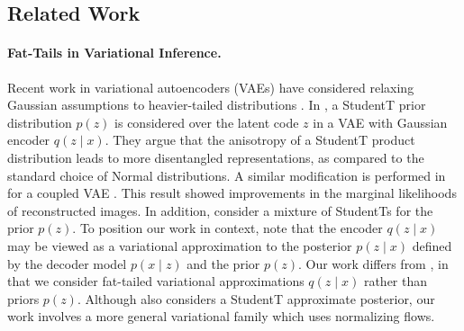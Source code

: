 \documentclass[nohyperref]{article}
\theoremstyle{plain}
\theoremstyle{definition}
\theoremstyle{remark}
\begin{document}
\subsection*{Related Work}
\vspace{-1mm}
\paragraph{Fat-Tails in Variational Inference.}

Recent work in variational autoencoders (VAEs) have considered relaxing Gaussian assumptions to heavier-tailed distributions \citep{mathieu2019disentangling,chen2019residual,boenninghoff2020variational,abiri2020variational}.
In \citet{mathieu2019disentangling}, a StudentT prior distribution $p(z)$ is considered over the latent code
$z$ in a VAE with Gaussian encoder $q(z \mid x)$. They argue
that the anisotropy of a StudentT product distribution leads to more disentangled representations, as compared to the standard choice of Normal distributions.
A similar modification is performed in \citet{chen2020use} for
a coupled VAE \citep{cao2019coupled}. 
This result showed improvements in the marginal
likelihoods of reconstructed images. In addition,
\citet{boenninghoff2020variational} consider a mixture of StudentTs for the
prior $p(z)$. To position
our work in context, note that the encoder $q(z \mid x)$ may be viewed
as a variational approximation to the posterior $p(z \mid x)$ defined by the
decoder model $p(x \mid z)$ and the prior $p(z)$. Our work differs from
\citet{mathieu2019disentangling,chen2020use,boenninghoff2020variational}, in
that we consider fat-tailed variational approximations $q(z \mid x)$ rather
than priors $p(z)$. Although \citet{abiri2020variational} also considers
a StudentT approximate posterior, our work involves a more general
variational family which uses normalizing flows.
\end{document}
